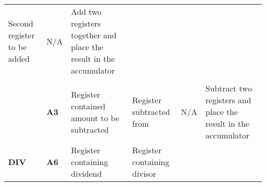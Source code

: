 \documentclass[]{article}
\begin{document}
\begin{longtable}[c]{@{}llllll@{}}
\begin{minipage}[t]{0.14\columnwidth}\raggedright\strut
Second register to be added~
\strut\end{minipage} &
\begin{minipage}[t]{0.14\columnwidth}\raggedright\strut
N/A
\strut\end{minipage} &
\begin{minipage}[t]{0.14\columnwidth}\raggedright\strut
Add two registers together and place the result in the accumulator
\strut\end{minipage}\tabularnewline
\begin{minipage}[t]{0.14\columnwidth}\raggedright\strut
\textbf{SUB}

\textbf{}\\
\strut\end{minipage} &
\begin{minipage}[t]{0.14\columnwidth}\raggedright\strut
\textbf{A3}
\strut\end{minipage} &
\begin{minipage}[t]{0.14\columnwidth}\raggedright\strut
Register contained amount to be subtracted
\strut\end{minipage} &
\begin{minipage}[t]{0.14\columnwidth}\raggedright\strut
Register subtracted from
\strut\end{minipage} &
\begin{minipage}[t]{0.14\columnwidth}\raggedright\strut
N/A
\strut\end{minipage} &
\begin{minipage}[t]{0.14\columnwidth}\raggedright\strut
Subtract two registers and place the result in the accumulator
\strut\end{minipage}\tabularnewline
\begin{minipage}[t]{0.14\columnwidth}\raggedright\strut
\textbf{DIV}
\strut\end{minipage} &
\begin{minipage}[t]{0.14\columnwidth}\raggedright\strut
\textbf{A6}
\strut\end{minipage} &
\begin{minipage}[t]{0.14\columnwidth}\raggedright\strut
Register containing dividend
\strut\end{minipage} &
\begin{minipage}[t]{0.14\columnwidth}\raggedright\strut
Register containing divisor
\strut\end{minipage} &
\begin{minipage}[t]{0.14\columnwidth}\raggedright\strut

\end{minipage}
\end{longtable}
\end{document}
